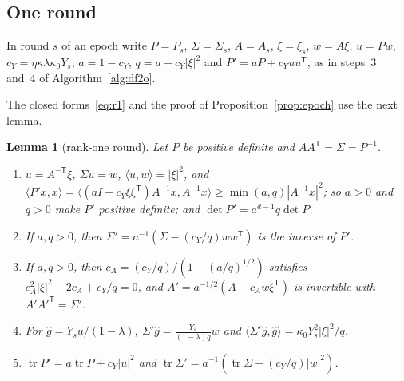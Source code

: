 \documentclass[11pt]{amsart}
\newtheorem{lemma}[theorem]{Lemma}
\theoremstyle{definition}
\numberwithin{equation}{section}
\newcommand{\tr}{\operatorname{tr}}
\newcommand{\ip}[1]{\langle #1\rangle}
\begin{document}
\subsection{One round}\label{app:epoch-round}

In round $s$ of an epoch write $P=P_s$, $\Sigma=\Sigma_s$, $A=A_s$, $\xi=\xi_s$, $w=A\xi$, $u=Pw$, $c_Y=\eta\kappa\lambda\kappa_0Y_s$, $a=1-c_Y$, $q=a+c_Y|\xi|^2$ and $P'=aP+c_Yuu^{\mathsf T}$, as in steps~3 and~4 of Algorithm~\ref{alg:df2o}.

The closed forms~\eqref{eq:r1} and the proof of Proposition~\ref{prop:epoch} use the next lemma.

\begin{lemma}[rank-one round]\label{lem:r1}
Let $P$ be positive definite and $AA^{\mathsf T}=\Sigma=P^{-1}$.
\begin{enumerate}[label=(\roman*)]
\item $u=A^{-\mathsf T}\xi$, $\Sigma u=w$, $\ip{u,w}=|\xi|^2$, and $\ip{P'x,x}=\ip{(aI+c_Y\xi\xi^{\mathsf T})A^{-1}x,A^{-1}x}\ge\min(a,q)|A^{-1}x|^2$; so $a>0$ and $q>0$ make $P'$ positive definite; and $\det P'=a^{d-1}q\det P$.
\item If $a,q>0$, then $\Sigma'=a^{-1}(\Sigma-(c_Y/q)ww^{\mathsf T})$ is the inverse of $P'$.
\item If $a,q>0$, then $c_A=(c_Y/q)/(1+(a/q)^{1/2})$ satisfies $c_A^2|\xi|^2-2c_A+c_Y/q=0$, and $A'=a^{-1/2}(A-c_Aw\xi^{\mathsf T})$ is invertible with $A'A'^{\mathsf T}=\Sigma'$.
\item For $\hat g=Y_su/(1-\lambda)$, $\Sigma'\hat g=\frac{Y_s}{(1-\lambda)q}w$ and $\ip{\Sigma'\hat g,\hat g}=\kappa_0Y_s^2|\xi|^2/q$.
\item $\tr P'=a\tr P+c_Y|u|^2$ and $\tr\Sigma'=a^{-1}(\tr\Sigma-(c_Y/q)|w|^2)$.
\end{enumerate}
\end{lemma}
\end{document}
